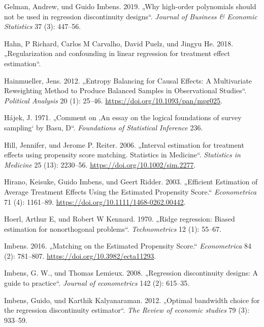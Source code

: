 \documentclass[
  a4paper,
  DIV=11,
  oneside]{scrreprt}
\newlength{\cslhangindent}
\newenvironment{CSLReferences}[2] %
 {\begin{list}{}{%
  \setlength{\itemindent}{0pt}
  \setlength{\leftmargin}{0pt}
  \setlength{\parsep}{0pt}
  \ifodd #1
   \setlength{\leftmargin}{\cslhangindent}
   \setlength{\itemindent}{-1\cslhangindent}
  \fi
  \setlength{\itemsep}{#2\baselineskip}}}
 {\end{list}}
\begin{document}
\begin{CSLReferences}{1}{0}
Gelman, Andrew, und Guido Imbens. 2019. {„Why high-order polynomials
should not be used in regression discontinuity designs``}. \emph{Journal
of Business \& Economic Statistics} 37 (3): 447--56.

Hahn, P Richard, Carlos M Carvalho, David Puelz, und Jingyu He. 2018.
{„Regularization and confounding in linear regression for treatment
effect estimation``}.

Hainmueller, Jens. 2012. {„Entropy Balancing for Causal Effects: A
Multivariate Reweighting Method to Produce Balanced Samples in
Observational Studies``}. \emph{Political Analysis} 20 (1): 25--46.
\url{https://doi.org/10.1093/pan/mpr025}.

Hájek, J. 1971. {„Comment on {‚An essay on the logical foundations of
survey sampling`} by Basu, D``}. \emph{Foundations of Statistical
Inference} 236.

Hill, Jennifer, und Jerome P. Reiter. 2006. {„Interval estimation for
treatment effects using propensity score matching. Statistics in
Medicine``}. \emph{Statistics in Medicine} 25 (13): 2230--56.
\url{https://doi.org/10.1002/sim.2277}.

Hirano, Keisuke, Guido Imbens, und Geert Ridder. 2003. {„Efficient
Estimation of Average Treatment Effects Using the Estimated Propensity
Score.``} \emph{Econometrica} 71 (4): 1161--89.
\url{https://doi.org/10.1111/1468-0262.00442}.

Hoerl, Arthur E, und Robert W Kennard. 1970. {„{Ridge regression: Biased
estimation for nonorthogonal problems}``}. \emph{Technometrics} 12 (1):
55--67.

Imbens. 2016. {„Matching on the Estimated Propensity Score.``}
\emph{Econometrica} 84 (2): 781--807.
\url{https://doi.org/10.3982/ecta11293}.

Imbens, G. W., und Thomas Lemieux. 2008. {„Regression discontinuity
designs: A guide to practice``}. \emph{Journal of econometrics} 142 (2):
615--35.

Imbens, Guido, und Karthik Kalyanaraman. 2012. {„Optimal bandwidth
choice for the regression discontinuity estimator``}. \emph{The Review
of economic studies} 79 (3): 933--59.


\end{CSLReferences}
\end{document}
